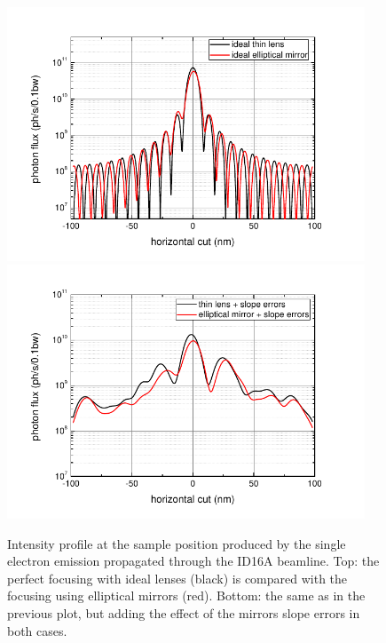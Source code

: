 \documentclass{iucr}              %
\begin{document}
\begin{figure}
    \centering
        \includegraphics[width=0.95\textwidth]{GRAPHICS/se_idealTE_idealOE_h.pdf}
        \includegraphics[width=0.95\textwidth]{GRAPHICS/ebs_slopeTE_slopeOE_h.pdf}
    \label{fig:SingleElectron}
    \caption{Intensity profile at the sample position produced by the single electron emission propagated through the ID16A beamline. Top: the perfect focusing with ideal lenses (black) is compared with the focusing using elliptical mirrors (red). Bottom: the same as in the previous plot, but adding the effect of the mirrors slope errors in both cases.}
\end{figure}
\end{document}
